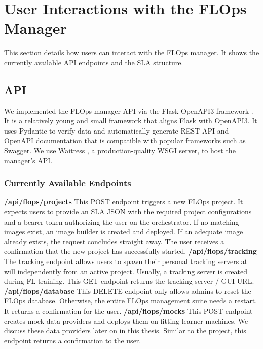 \section{User Interactions with the FLOps Manager}
This section details how users can interact with the FLOps manager.
It shows the currently available API endpoints and the SLA structure.

\subsection{API} \label{subsection:api}
We implemented the FLOps manager API via the Flask-OpenAPI3 framework \cite{framework:flask_openapi3}.
It is a relatively young and small framework that aligns Flask with OpenAPI3.
It uses Pydantic to verify data and automatically generate REST API and OpenAPI documentation that is compatible with popular frameworks such as Swagger.
We use Waitress \cite{waitress}, a production-quality WSGI server, to host the manager's API.

\subsubsection{Currently Available Endpoints}
\textbf{/api/flops/projects}\newline
This POST endpoint triggers a new FLOps project.
It expects users to provide an SLA JSON with the required project configurations and a bearer token authorizing the user on the orchestrator.
If no matching images exist, an image builder is created and deployed.
If an adequate image already exists, the request concludes straight away.
The user receives a confirmation that the new project has successfully started.
\vspace{5mm}
\newline
\textbf{/api/flops/tracking}\newline
The tracking endpoint allows users to spawn their personal tracking servers at will independently from an active project.
Usually, a tracking server is created during FL training.
This GET endpoint returns the tracking server / GUI URL.
\vspace{5mm}
\newline
\textbf{/api/flops/database}\newline
This DELETE endpoint only allows admins to reset the FLOps database.
Otherwise, the entire FLOps management suite needs a restart.
It returns a confirmation for the user.
\vspace{5mm}
\newline
\textbf{/api/flops/mocks}\newline
This POST endpoint creates mock data providers and deploys them on fitting learner machines.
We discuss these data providers later on in this thesis.
Similar to the project, this endpoint returns a confirmation to the user.
\vspace{5mm}
\newline

